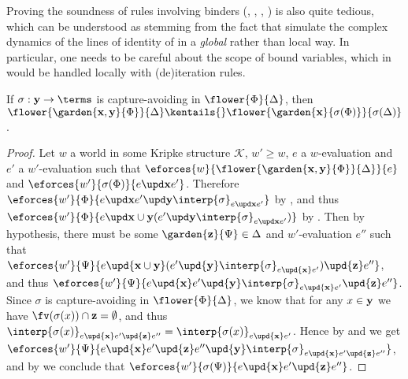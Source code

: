 \begin{scope}
Proving the soundness of rules involving binders (, ,
, ) is also quite tedious, which can be understood as
stemming from the fact that  simulate the complex dynamics of the
lines of identity of  in a \emph{global} rather than local way. In particular,
one needs to be careful about the scope of bound variables, which in  would be
handled locally with (de)iteration rules.

\begin{lemma}
  
  If $\sigma : \by \to \terms$ is capture-avoiding in $\flower{\Phi}{\Delta}$,
  then $\flower{\garden{\bx, \by}{\Phi}}{\Delta} \kentails{}
  \flower{\garden{\bx}{\sigma(\Phi)}}{\sigma(\Delta)}$.
\end{lemma}
\begin{proof}
  Let $w$ a world in some Kripke structure $\mathcal{K}$, $w' \geq w$, $e$
  a $w$-evaluation and $e'$ a $w'$-evaluation such that
  $\eforces{w}{\flower{\garden{\bx,\by}{\Phi}}{\Delta}}{e}$ and
  $\eforces{w'}{\sigma(\Phi)}{\update{e}{\bx}{e'}}$. Therefore
  $\eforces{w'}{\Phi}{\update{e}{\bx}{\update{e'}{\by}{\interp{\sigma}_{\update{e}{\bx}{e'}}}}}$
  by , and thus $\eforces{w'}{\Phi}{\update{e}{\bx \cup
  \by}{(\update{e'}{\by}{\interp{\sigma}_{\update{e}{\bx}{e'}}})}}$ by
  . Then by hypothesis, there must be some
  $\garden{\bz}{\Psi} \in \Delta$ and $w'$-evaluation $e''$ such that
  $\eforces{w'}{\Psi}{e \upd{\bx \cup \by} (e' \upd{\by} \interp{\sigma}_{e
  \upd{\bx} e'}) \upd{\bz} e''}$, and thus $\eforces{w'}{\Psi}{e \upd{\bx} e'
  \upd{\by} \interp{\sigma}_{e \upd{\bx} e'} \upd{\bz} e''}$. Since $\sigma$ is
  capture-avoiding in $\flower{\Phi}{\Delta}$, we know that for any $x \in \mathbf{y}$
  we have $\fv(\sigma(x)) \cap \bz = \emptyset$, and thus $\interp{\sigma(x)}_{e
  \upd{\bx} e' \upd{\bz} e''} = \interp{\sigma(x)}_{e \upd{\bx} e'}$. Hence by
   and  we get $\eforces{w'}{\Psi}{e
  \upd{\bx} e' \upd{\bz} e'' \upd{\by} \interp{\sigma}_{e \upd{\bx} e' \upd{\bz}
  e''}}$, and by  we conclude that
  $\eforces{w'}{\sigma(\Psi)}{e \upd{\bx} e' \upd{\bz} e''}$.
\end{proof}

\begin{lemma}
  

\end{lemma}
\end{scope}
